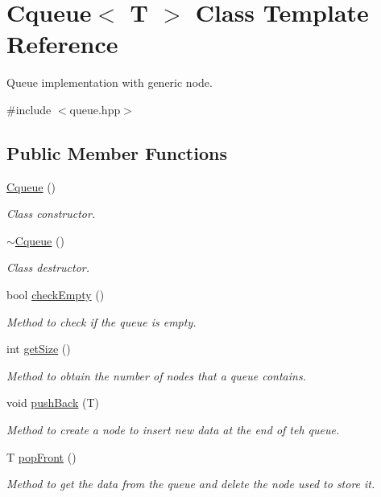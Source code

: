 \hypertarget{class_cqueue}{}\section{Cqueue$<$ T $>$ Class Template Reference}
\label{class_cqueue}


Queue implementation with generic node.  




{\ttfamily \#include $<$queue.\+hpp$>$}

\subsection*{Public Member Functions}
\begin{DoxyCompactItemize}
\item 
\mbox{\label{class_cqueue_a51d056d90c0162bbbdf554a2d4af785b}} 
\mbox{\hyperlink{class_cqueue_a51d056d90c0162bbbdf554a2d4af785b}{Cqueue}} ()
\begin{DoxyCompactList}\small\item\em Class constructor. \end{DoxyCompactList}\item 
\mbox{\label{class_cqueue_a2946de536ff33e0d84f721ce2d90056a}} 
\mbox{\hyperlink{class_cqueue_a2946de536ff33e0d84f721ce2d90056a}{$\sim$\+Cqueue}} ()
\begin{DoxyCompactList}\small\item\em Class destructor. \end{DoxyCompactList}\item 
bool \mbox{\hyperlink{class_cqueue_a7c20a21cd08b993af7222796322ccaec}{check\+Empty}} ()
\begin{DoxyCompactList}\small\item\em Method to check if the queue is empty. \end{DoxyCompactList}\item 
int \mbox{\hyperlink{class_cqueue_ad9baee6f6676b1eb0f0dfe450ba38eb1}{get\+Size}} ()
\begin{DoxyCompactList}\small\item\em Method to obtain the number of nodes that a queue contains. \end{DoxyCompactList}\item 
void \mbox{\hyperlink{class_cqueue_a901e6cfb613e56c487297633feb479b1}{push\+Back}} (T)
\begin{DoxyCompactList}\small\item\em Method to create a node to insert new data at the end of teh queue. \end{DoxyCompactList}\item 
T \mbox{\hyperlink{class_cqueue_a77d4728406bf0777254695f164132f3a}{pop\+Front}} ()
\begin{DoxyCompactList}\small\item\em Method to get the data from the queue and delete the node used to store it. \end{DoxyCompactList}\end{DoxyCompactItemize}


